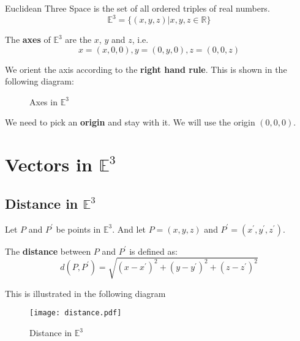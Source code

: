 \begin{definition}
 
  Euclidean Three Space is the set of all ordered triples of real numbers.\\
  \vspace{-10px}
  \begin{equation}
    \mathbb{E}^3 = \{(x,y,z) | x,y,z \in \mathbb{R}\}
  \end{equation}

\end{definition}

The \textbf{axes} of $\mathbb{E}^{3}$ are the $x$, $y$ and $z$, i.e.
\vspace{-10px}
\begin{equation}
  x = (x,0,0), y = (0,y,0), z = (0,0,z)
\end{equation}

We orient the axis according to the \textbf{right hand rule}. This is shown in the following diagram:


\begin{figure}[H]
  \centering
  \caption{Axes in $\mathbb{E}^3$}
\end{figure}

\begin{note}
  We need to pick an \textbf{origin} and stay with it. We will use the origin $(0,0,0)$.
\end{note} 

\section{Vectors in $\mathbb{E}^3$}
\subsection{Distance in $\mathbb{E}^3$}
Let $P$ and $P^{'}$ be points in $\mathbb{E}^3$. And let $P = (x,y,z)$ and $P^{'} = (x^{'},y^{'},z^{'})$.
\begin{definition}
  The \textbf{distance} between $P$ and $P^{'}$ is defined as:
  \begin{equation}
    d(P,P^{'}) = \sqrt{(x-x^{'})^2 + (y-y^{'})^2 + (z-z^{'})^2}
  \end{equation}
\end{definition}
This is illustrated in the following diagram
\begin{figure}[H]
\centering
   \texttt{[image: distance.pdf]}
   \caption{Distance in $\mathbb{E}^3$}
   \label{fig:figure-8-space}
\end{figure}
\clearpage
